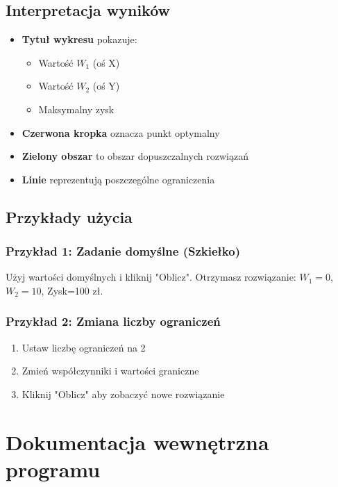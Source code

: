 \documentclass[12pt,a4paper]{article}
\begin{document}
\subsection{Interpretacja wyników}

\begin{itemize}
    \item \textbf{Tytuł wykresu} pokazuje:
    \begin{itemize}
        \item Wartość $W_1$ (oś X)
        \item Wartość $W_2$ (oś Y)
        \item Maksymalny zysk
    \end{itemize}
    \item \textbf{Czerwona kropka} oznacza punkt optymalny
    \item \textbf{Zielony obszar} to obszar dopuszczalnych rozwiązań
    \item \textbf{Linie} reprezentują poszczególne ograniczenia
\end{itemize}

\subsection{Przykłady użycia}

\subsubsection{Przykład 1: Zadanie domyślne (Szkiełko)}

Użyj wartości domyślnych i kliknij "Oblicz". Otrzymasz rozwiązanie: $W_1=0$, $W_2=10$, Zysk=100 zł.

\subsubsection{Przykład 2: Zmiana liczby ograniczeń}

\begin{enumerate}
    \item Ustaw liczbę ograniczeń na 2
    \item Zmień współczynniki i wartości graniczne
    \item Kliknij "Oblicz" aby zobaczyć nowe rozwiązanie
\end{enumerate}

\section{Dokumentacja wewnętrzna programu}
\end{document}

